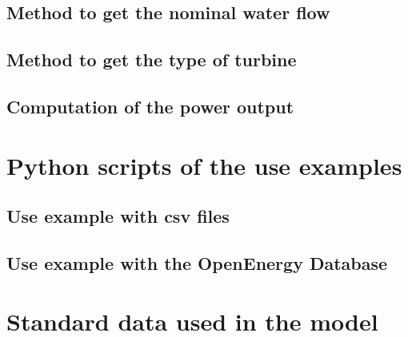 \section{Method to get the nominal water flow}
\label{app:get_dV_n}


\newpage
\section{Method to get the type of turbine}
\label{app:get_turb_type}


\newpage
\section{Computation of the power output}
\label{app:powout}



\chapter{Python scripts of the use examples}

\section{Use example with csv files}
\label{app:ex_with_csv}


\newpage
\section{Use example with the OpenEnergy Database}
\label{app:ex_with_oedb}


\newpage
\chapter{Standard data used in the model}

